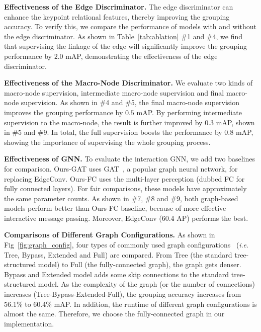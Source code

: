 \documentclass[runningheads]{llncs}
\newcommand{\ie}{\textit{i}.\textit{e}. }
\begin{document}
	\textbf{Effectiveness of the Edge Discriminator.}
	The edge discriminator can enhance the keypoint relational features, thereby improving the grouping accuracy.
	To verify this, we compare the performance of models with and without the edge discriminator. As shown in Table~\ref{tab:ablation} \#1 and \#4, we find that supervising the linkage of the edge will significantly improve the grouping performance by $2.0$ mAP, demonstrating the effectiveness of the edge discriminator.
	
	\textbf{Effectiveness of the Macro-Node Discriminator.}
	We evaluate two kinds of macro-node supervision, intermediate macro-node supervision and final macro-node supervision. As shown in \#4 and \#5, the final macro-node supervision improves the grouping performance by $0.5$ mAP. By performing intermediate supervision to the macro-node, the result is further improved by $0.3$ mAP, shown in \#5 and \#9. In total, the full supervision boosts the performance by $0.8$ mAP, showing the importance of supervising the whole grouping process.  
	
	
	\textbf{Effectiveness of GNN.}
	To evaluate the interaction GNN, we add two baselines for comparison. Ours-GAT uses GAT~\cite{velivckovic2018graph}, a popular graph neural network, for replacing EdgeConv. Ours-FC uses the multi-layer perception (dubbed FC for fully connected layers). For fair comparisons, these models have approximately the same parameter counts. As shown in \#7, \#8 and \#9, both graph-based models perform better than Ours-FC baseline, because of more effective interactive message passing. Moreover, EdgeConv (60.4 AP) performs the best.
	
	
	\textbf{Comparisons of Different Graph Configurations.}
	As shown in Fig~\ref{fig:graph_config}, four types of commonly used graph configurations~\cite{doering2018joint} (\ie Tree, Bypass, Extended and Full) are compared. From Tree (the standard tree-structured model) to Full (the fully-connected graph), the graph gets denser. Bypass and Extended model adds some skip connections to the standard tree-structured model. As the complexity of the graph (or the number of connections) increases (Tree-Bypass-Extended-Full), the grouping accuracy increases from 56.1\% to 60.4\% mAP. In addition, the runtime of different graph configurations is almost the same. Therefore, we choose the fully-connected graph in our implementation.
	
\end{document}
